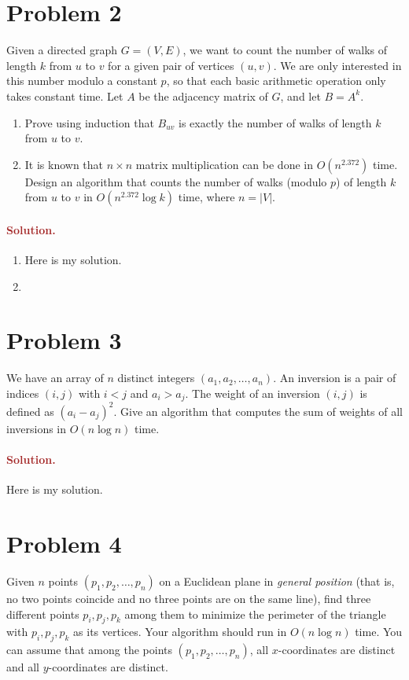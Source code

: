 \section*{Problem 2}
Given a directed graph $G = (V, E)$, we want to count the number of walks of length $k$ from $u$ to $v$ for a given pair of vertices $(u, v)$. We are only interested in this number modulo a constant $p$, so that each basic arithmetic operation only takes constant time. Let $A$ be the adjacency matrix of $G$, and let $B = A^k$.
\begin{enumerate}
    \item Prove using induction that $B_{uv}$ is exactly the number of walks of length $k$ from $u$ to $v$.
    \item It is known that $n \times n$ matrix multiplication can be done in $O(n^{2.372})$ time. Design an algorithm that counts the number of walks (modulo $p$) of length $k$ from $u$ to $v$ in $O(n^{2.372} \log k)$ time, where $n = |V|$.
\end{enumerate}

\paragraph{\textcolor{brown}{Solution.}}
\begin{enumerate}
    \item Here is my solution.
    \item 
\end{enumerate}


\section*{Problem 3}
We have an array of $n$ distinct integers $(a_1, a_2, \ldots, a_n)$. An inversion is a pair of indices $(i, j)$ with $i < j$ and $a_i > a_j$. The weight of an inversion $(i, j)$ is defined as $(a_i - a_j)^2$. Give an algorithm that computes the sum of weights of all inversions in $O(n \log n)$ time.

\paragraph{\textcolor{brown}{Solution.}}
Here is my solution.

\section*{Problem 4}
Given $n$ points $(p_1, p_2, \ldots, p_n)$ on a Euclidean plane in \emph{general position} (that is, no two points coincide and no three points are on the same line), find three different points $p_i, p_j, p_k$ among them to minimize the perimeter of the triangle with $p_i, p_j, p_k$ as its vertices. Your algorithm should run in $O(n \log n)$ time. You can assume that among the points $(p_1, p_2, \ldots, p_n)$, all $x$-coordinates are distinct and all $y$-coordinates are distinct.

